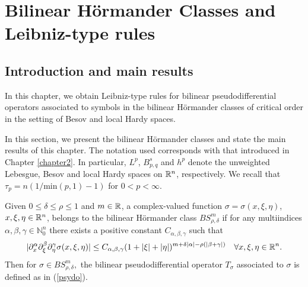 
\cleardoublepage


\chapter{Bilinear H\"ormander Classes and Leibniz-type rules}\label{chapter3}
\label{makereference3}

\section{Introduction and main results}

In this chapter, we obtain Leibniz-type rules for bilinear pseudodifferential operators associated to symbols in the bilinear H\"ormander classes of critical order in the setting of Besov and local Hardy spaces. 

In this section, we present the bilinear H\"ormander classes and state the main results of this chapter. The notation used corresponds with that introduced in Chapter \ref{chapter2}. In particular, $L^p$, $B^s_{p,q}$ and $h^p$ denote the unweighted Lebesgue, Besov and local Hardy spaces on ${{\mathbb R}^n}$, respectively. We recall that $\tau_p = n(1/\text{min}(p,1) - 1)$ for $0<p<\infty$. 

Given $0\leq \delta \leq \rho \leq 1$ and $m\in\mathbb{R}$, a complex-valued function $\sigma = \sigma(x,\xi,\eta)$, $x,\xi,\eta \in {{\mathbb R}^n}$, belongs to the bilinear H\"ormander class $BS^m_{\rho,\delta}$ if for any multiindices $\alpha,\beta,\gamma \in \mathbb{N}^n_0$ there exists a positive constant $C_{\alpha,\beta,\gamma}$ such that 
\begin{equation}\label{def:Bmrd}
|\partial_x^\alpha \partial_\xi^\beta \partial_\eta^\gamma \sigma(x, \xi, \eta)| \leq C_{\alpha, \beta, \gamma} (1+|\xi|+|\eta|)^{m +\delta \left\vert \alpha \right\vert-\rho(\left\vert \beta+\gamma \right\vert)} \quad \forall x, \xi, \eta \in {{\mathbb R}^n}.
\end{equation}
Then for $\sigma \in BS^m_{\rho,\delta},$ the bilinear pseudodifferential operator $T_\sigma$ associated to $\sigma$ is defined as in (\ref{psydo}). 

